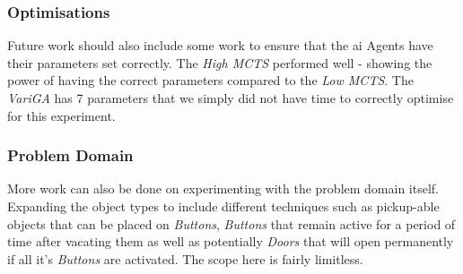 \documentclass{IEEEtran}
\begin{document}
\subsubsection{Optimisations}
Future work should also include some work to ensure that the \gls{ai} Agents have their parameters set correctly. The \emph{High MCTS} performed well - showing the power of having the correct parameters compared to the \emph{Low MCTS}. The \emph{VariGA} has 7 parameters that we simply did not have time to correctly optimise for this experiment.

\subsubsection{Problem Domain}
More work can also be done on experimenting with the problem domain itself. Expanding the object types to include different techniques such as pickup-able objects that can be placed on \emph{Buttons}, \emph{Buttons} that remain active for a period of time after vacating them as well as potentially \emph{Doors} that will open permanently if all it's \emph{Buttons} are activated. The scope here is fairly limitless.



\end{document}
